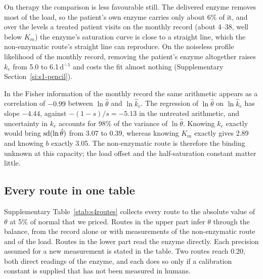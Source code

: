 On therapy the comparison is less favourable still. The delivered enzyme removes most of the
load, so the patient's own enzyme carries only about 6\% of it, and over the levels a treated
patient visits on the monthly record (about 4--38\uM, well below $K_m$) the enzyme's
saturation curve is close to a straight line, which the non-enzymatic route's straight line
can reproduce. On the noiseless profile
likelihood of the monthly record, removing the patient's enzyme altogether raises $k_e$ from
5.0 to 6.1\,d$^{-1}$ and costs the fit almost nothing (Supplementary
Section~\ref{si:s1-pencil}).

In the Fisher information of the monthly record the same arithmetic appears as a correlation
of $-0.99$ between $\ln\hat\theta$ and $\ln\hat k_e$. The regression of $\ln\hat\theta$ on
$\ln\hat k_e$ has slope $-4.44$, against $-(1-s)/s=-5.13$ in the untreated arithmetic, and
uncertainty in $k_e$ accounts for 98\% of the variance of $\ln\hat\theta$. Knowing $k_e$ exactly
would bring $\operatorname{sd}(\ln \hat\theta)$ from 3.07 to 0.39, whereas knowing $K_m$ exactly gives 2.89 and
knowing $b$ exactly 3.05. The non-enzymatic route is therefore the binding unknown at this
capacity; the load offset and the half-saturation constant matter little.

\subsection{Every route in one table}
\label{si:s4:table}

Supplementary Table~\ref{stab:s4routes} collects every route to the absolute value of $\theta$
at 5\% of normal that we priced. Routes in the upper part infer $\theta$ through the balance,
from the record alone or with measurements of the non-enzymatic route and of the load. Routes
in the lower part read the enzyme directly. Each precision assumed for a new measurement is
stated in the table. Two routes reach 0.20, both direct readings of the enzyme, and each does
so only if a calibration constant is supplied that has not been measured in humans.

